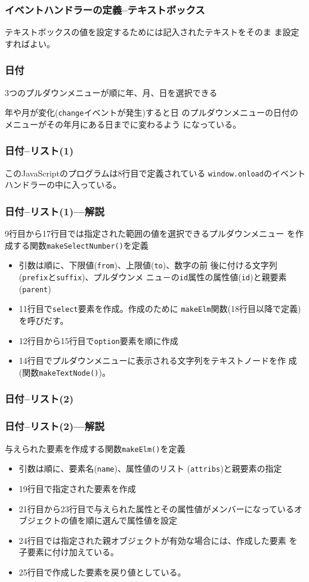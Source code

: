 \begin{frame}[containsverbatim]
 \frametitle{イベントハンドラーの定義--テキストボックス}
 テキストボックスの値を設定するためには記入されたテキストをそのま
       ま設定すればよい。
\end{frame}
\begin{frame}[containsverbatim]
\frametitle{日付}
3つのプルダウンメニューが順に年、月、日を選択できる

年や月が変化(\texttt{change}イベントが発生)すると日
 のプルダウンメニューの日付のメニューがその年月にある日までに変わるよう
 になっている。
\end{frame}
\begin{frame}[containsverbatim]
\frametitle{日付--リスト(1)}
 このJavaScriptのプログラムは8行目で定義されている
       \texttt{window.onload}のイベントハンドラーの中に入っている。

\end{frame}
\begin{frame}[containsverbatim]
\frametitle{日付--リスト(1)---解説}
 9行目から17行目では指定された範囲の値を選択できるプルダウンメニュー
       を作成する関数\texttt{makeSelectNumber()}を定義
\begin{itemize}
 \item 引数は順に、下限値(\texttt{from})、上限値(\texttt{to})、数字の前
       後に付ける文字列(\texttt{prefix}と\texttt{suffix})、プルダウンメ
       ニュ－の\texttt{id}属性の属性値(\texttt{id})と親要素
       (\texttt{parent})
 \item 11行目で\texttt{select}要素を作成。作成のために
       \texttt{makeElm}関数(18行目以降で定義)を呼びだす。
 \item 12行目から15行目で\texttt{option}要素を順に作成
 \item 14行目でプルダウンメニューに表示される文字列をテキストノードを作
       成(関数\texttt{makeTextNode()})。
\end{itemize}
\end{frame}
\begin{frame}[containsverbatim]
\frametitle{日付--リスト(2)}
\end{frame}
\begin{frame}[containsverbatim]
\frametitle{日付--リスト(2)---解説}
与えられた要素を作成する関数\texttt{makeElm()}を定義
\begin{itemize}
 \item 引数は順に、要素名(\texttt{name})、属性値のリスト
       (\texttt{attribs})と親要素の指定
 \item 19行目で指定された要素を作成
 \item 21行目から23行目で与えられた属性とその属性値がメンバーになっているオ
       ブジェクトの値を順に選んで属性値を設定
 \item 24行目では指定された親オブジェクトが有効な場合には、作成した要素
       を子要素に付け加えている。
 \item 25行目で作成した要素を戻り値としている。
\end{itemize}
\end{frame}
